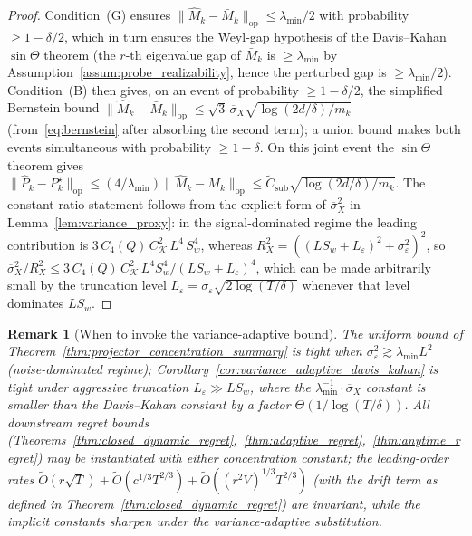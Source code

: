 \documentclass[11pt]{article}
\newcommand{\op}{\mathrm{op}}
\newtheorem{remark}{Remark}
\begin{document}
\begin{proof}
Condition~(G) ensures
$\|\widehat M_k-\bar M_k\|_{\op}\le\lambda_{\min}/2$ with probability
$\ge 1-\delta/2$, which in turn ensures the Weyl-gap hypothesis of the
Davis--Kahan $\sin\Theta$ theorem (the $r$-th eigenvalue gap of
$\bar M_k$ is $\ge\lambda_{\min}$ by
Assumption~\ref{assum:probe_realizability}, hence the perturbed gap is
$\ge\lambda_{\min}/2$).  Condition~(B) then gives, on an event of
probability $\ge 1-\delta/2$, the simplified Bernstein bound
$\|\widehat M_k-\bar M_k\|_{\op}\le\sqrt{3}\,\overline{\sigma}_X
\sqrt{\log(2d/\delta)/m_k}$ (from~\eqref{eq:bernstein} after absorbing
the second term); a union bound makes both events simultaneous with
probability $\ge 1-\delta$.  On this joint event the $\sin\Theta$
theorem gives
$\|\widehat P_k-P_k^\star\|_{\op}\le(4/\lambda_{\min})
\|\widehat M_k-\bar M_k\|_{\op}\le\widetilde C_{\mathrm{sub}}
\sqrt{\log(2d/\delta)/m_k}$.
The constant-ratio statement follows from the explicit form of
$\overline\sigma_X^2$ in Lemma~\ref{lem:variance_proxy}: in the
signal-dominated regime the leading contribution is
$3\,C_4(Q)\,C_{\mathcal K}^2\,L^4\,S_w^4$, whereas
$R_X^2=((LS_w+L_\varepsilon)^2+\sigma_\varepsilon^2)^2$, so
$\overline\sigma_X^2/R_X^2\le 3\,C_4(Q)\,C_{\mathcal K}^2\,L^4 S_w^4/(LS_w+L_\varepsilon)^4$,
which can be made arbitrarily small by the truncation level
$L_\varepsilon=\sigma_\varepsilon\sqrt{2\log(T/\delta)}$ whenever that level
dominates $LS_w$.
\end{proof}

\begin{remark}[When to invoke the variance-adaptive bound]
\label{rem:when_variance_adaptive}
The uniform bound of
Theorem~\ref{thm:projector_concentration_summary} is tight when
$\sigma_\varepsilon^2\gtrsim\lambda_{\min}L^2$ (noise-dominated regime);
Corollary~\ref{cor:variance_adaptive_davis_kahan} is tight under aggressive
truncation $L_\varepsilon\gg LS_w$, where the $\lambda_{\min}^{-1}\cdot\overline{\sigma}_X$
constant is smaller than the Davis--Kahan constant by a factor $\Theta(1/\log(T/\delta))$.
All downstream regret bounds
(Theorems~\ref{thm:closed_dynamic_regret},~\ref{thm:adaptive_regret},~\ref{thm:anytime_regret})
may be instantiated with either concentration constant; the leading-order
rates $\widetilde O(r\sqrt T)+\widetilde O(c^{1/3}T^{2/3})+\widetilde O((r^2V)^{1/3}T^{2/3})$
(with the drift term as defined in Theorem~\ref{thm:closed_dynamic_regret})
are invariant, while the implicit constants sharpen under the variance-adaptive
substitution.
\end{remark}
\end{document}

